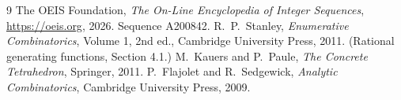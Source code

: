 \documentclass[11pt,a4paper]{article}
\theoremstyle{plain}
\theoremstyle{definition}
\begin{document}
\begin{thebibliography}{9}
 The OEIS Foundation, \emph{The On-Line Encyclopedia of Integer
Sequences}, \url{https://oeis.org}, 2026. Sequence A200842.
 R.~P.~Stanley, \emph{Enumerative Combinatorics}, Volume 1, 2nd ed.,
Cambridge University Press, 2011. (Rational generating functions, Section 4.1.)
 M.~Kauers and P.~Paule, \emph{The Concrete Tetrahedron}, Springer, 2011.
 P.~Flajolet and R.~Sedgewick, \emph{Analytic Combinatorics}, Cambridge
University Press, 2009.
\end{thebibliography}
\end{document}
